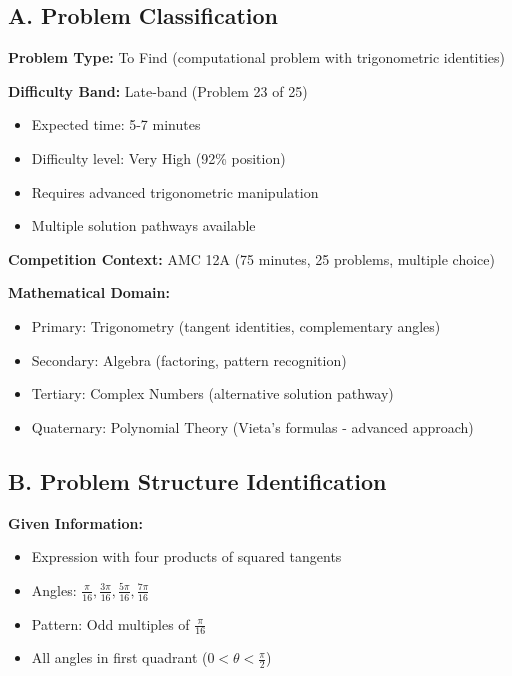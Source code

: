 \documentclass[12pt]{article}
\begin{document}
\begin{problemconfigbox}

\subsection*{A. Problem Classification}

\textbf{Problem Type:} To Find (computational problem with trigonometric identities)

\textbf{Difficulty Band:} Late-band (Problem 23 of 25)
\begin{itemize}
    \item Expected time: 5-7 minutes
    \item Difficulty level: Very High (92\% position)
    \item Requires advanced trigonometric manipulation
    \item Multiple solution pathways available
\end{itemize}

\textbf{Competition Context:} AMC 12A (75 minutes, 25 problems, multiple choice)

\textbf{Mathematical Domain:} 
\begin{itemize}
    \item Primary: Trigonometry (tangent identities, complementary angles)
    \item Secondary: Algebra (factoring, pattern recognition)
    \item Tertiary: Complex Numbers (alternative solution pathway)
    \item Quaternary: Polynomial Theory (Vieta's formulas - advanced approach)
\end{itemize}

\subsection*{B. Problem Structure Identification}

\textbf{Given Information:}
\begin{itemize}
    \item Expression with four products of squared tangents
    \item Angles: $\frac{\pi}{16}, \frac{3\pi}{16}, \frac{5\pi}{16}, \frac{7\pi}{16}$
    \item Pattern: Odd multiples of $\frac{\pi}{16}$
    \item All angles in first quadrant ($0 < \theta < \frac{\pi}{2}$)
\end{itemize}


\end{problemconfigbox}
\end{document}
